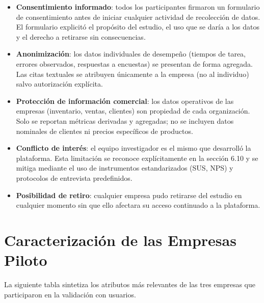 \begin{itemize}
\tightlist
\item
  \textbf{Consentimiento informado}: todos los participantes firmaron un formulario de consentimiento antes de iniciar cualquier actividad de recolección de datos. El formulario explicitó el propósito del estudio, el uso que se daría a los datos y el derecho a retirarse sin consecuencias.
\item
  \textbf{Anonimización}: los datos individuales de desempeño (tiempos de tarea, errores observados, respuestas a encuestas) se presentan de forma agregada. Las citas textuales se atribuyen únicamente a la empresa (no al individuo) salvo autorización explícita.
\item
  \textbf{Protección de información comercial}: los datos operativos de las empresas (inventario, ventas, clientes) son propiedad de cada organización. Solo se reportan métricas derivadas y agregadas; no se incluyen datos nominales de clientes ni precios específicos de productos.
\item
  \textbf{Conflicto de interés}: el equipo investigador es el mismo que desarrolló la plataforma. Esta limitación se reconoce explícitamente en la sección 6.10 y se mitiga mediante el uso de instrumentos estandarizados (SUS, NPS) y protocolos de entrevista predefinidos.
\item
  \textbf{Posibilidad de retiro}: cualquier empresa pudo retirarse del estudio en cualquier momento sin que ello afectara su acceso continuado a la plataforma.
\end{itemize}

\section{Caracterización de las Empresas Piloto}\label{caracterizaciuxf3n-de-las-empresas-piloto}

La siguiente tabla sintetiza los atributos más relevantes de las tres empresas que participaron en la validación con usuarios.


